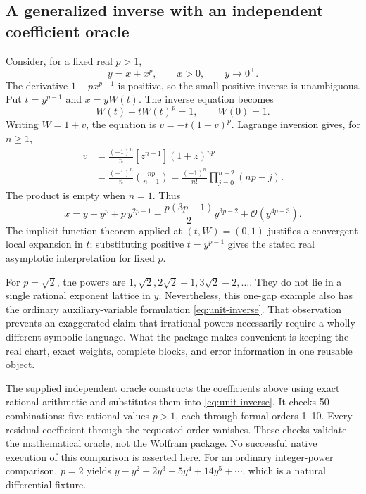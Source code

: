 \documentclass[11pt,letterpaper]{article}
\newcommand{\code}[1]{\texttt{\detokenize{#1}}}
\newcommand{\Ocal}{\mathcal{O}}
\begin{document}
\subsection{A generalized inverse with an independent coefficient oracle}

Consider, for a fixed real $p>1$,
\[
 y=x+x^p,\qquad x>0,\qquad y\longrightarrow0^+.
\]
The derivative $1+px^{p-1}$ is positive, so the small positive inverse is
unambiguous. Put $t=y^{p-1}$ and $x=yW(t)$. The inverse equation becomes
\begin{equation}\label{eq:unit-inverse}
 W(t)+tW(t)^p=1,\qquad W(0)=1.
\end{equation}
Writing $W=1+v$, the equation is $v=-t(1+v)^p$. Lagrange inversion gives,
for $n\ge1$,
\begin{align}
 [t^n]v
 &=\frac{(-1)^n}{n}[z^{n-1}](1+z)^{np}\\
 &=\frac{(-1)^n}{n}\binom{np}{n-1}
  =\frac{(-1)^n}{n!}\prod_{j=0}^{n-2}(np-j).
\end{align}
The product is empty when $n=1$. Thus
\begin{equation}\label{eq:inverse-expansion}
 x=y-y^p+p\,y^{2p-1}
   -\frac{p(3p-1)}{2}y^{3p-2}
   +\Ocal(y^{4p-3}).
\end{equation}
The implicit-function theorem applied at $(t,W)=(0,1)$ justifies a convergent
local expansion in $t$; substituting positive $t=y^{p-1}$ gives the stated
real asymptotic interpretation for fixed $p$.

For $p=\sqrt2$, the powers are $1,\sqrt2,2\sqrt2-1,3\sqrt2-2,\ldots$.
They do not lie in a single rational exponent lattice in $y$. Nevertheless,
this one-gap example also has the ordinary auxiliary-variable formulation
\eqref{eq:unit-inverse}. That observation prevents an exaggerated claim that
irrational powers necessarily require a wholly different symbolic language.
What the package makes convenient is keeping the real chart, exact weights,
complete blocks, and error information in one reusable object.

The supplied independent oracle constructs the coefficients above using
exact rational arithmetic and substitutes them into
\eqref{eq:unit-inverse}. It checks 50 combinations: five rational values
$p>1$, each through formal orders 1--10. Every residual coefficient through
the requested order vanishes. These checks validate the mathematical oracle,
not the Wolfram package. No successful native execution of this comparison
is asserted here. For an ordinary integer-power comparison, $p=2$ yields
$y-y^2+2y^3-5y^4+14y^5+\cdots$, which is a natural
\code{InverseSeries} differential fixture.
\end{document}
